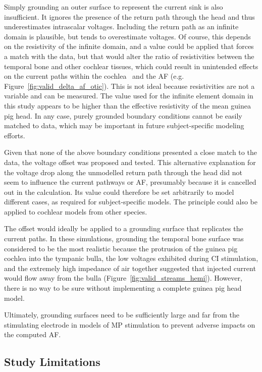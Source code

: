 Simply grounding an outer surface to represent the current sink is also
insufficient. It ignores the presence of the return path through the head and
thus underestimates intrascalar voltages. Including the return path as an
infinite domain is plausible, but tends to overestimate voltages. Of course,
this depends on the resistivity of the infinite domain, and a value could be
applied that forces a match with the \invivo{} data, but that would alter the
ratio of resistivities between the temporal bone and other cochlear tissues,
which could result in unintended effects on the current paths within the
cochlea~\cite{micco2006,wong2013mb} and the AF (e.g.
Figure~\ref{fig:valid_delta_af_otic}). This is not ideal because resistivities
are not a variable and can be measured. The value used for the infinite element
domain in this study appears to be higher than the effective resistivity of the
mean guinea pig head. In any case, purely grounded boundary conditions cannot be
easily matched to \invivo{} data, which may be important in future
subject-specific modeling efforts.

Given that none of the above boundary conditions presented a close match to the
\invivo{} data, the voltage offset was proposed and tested. This alternative
explanation for the voltage drop along the unmodelled return path through the
head did not seem to influence the current pathways or AF, presumably because it
is cancelled out in the calculation. Its value could therefore be set
arbitrarily to model different cases, as required for subject-specific models.
The principle could also be applied to cochlear models from other species.

The offset would ideally be applied to a grounding surface that replicates the
\invivo{} current paths. In these simulations, grounding the temporal bone
surface was considered to be the most realistic because the protrusion of the
guinea pig cochlea into the tympanic bulla, the low voltages exhibited during CI
stimulation, and the extremely high impedance of air together suggested that
injected current would flow away from the bulla
(Figure~\ref{fig:valid_streams_hemi}). However, there is no way to be sure
without implementing a complete guinea pig head model.

Ultimately, grounding surfaces need to be sufficiently large and far from the
stimulating electrode in models of MP stimulation to prevent adverse impacts on
the computed AF.

\subsection{Study Limitations}

